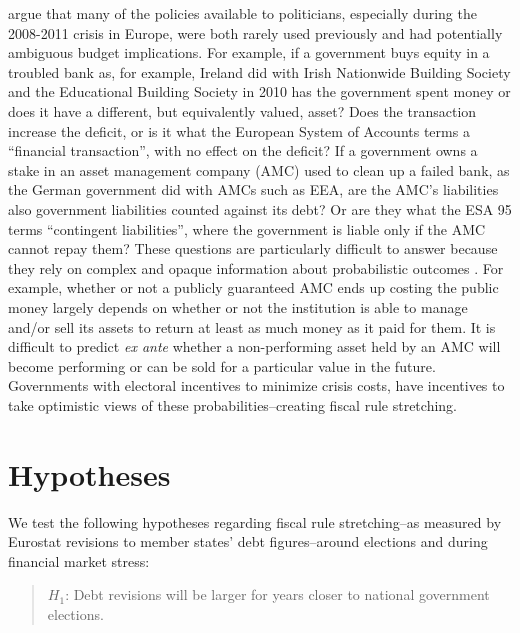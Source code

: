 \documentclass[]{article}
\begin{document}
\cite{GandrudHallerberg2016} argue that many of the policies available to politicians, especially during the 2008-2011 crisis in Europe, were both rarely used previously and had potentially ambiguous budget implications. For example, if a government buys equity in a troubled bank as, for example, Ireland did with Irish Nationwide Building Society and the Educational Building Society in 2010 has the government spent money or does it have a different, but equivalently valued, asset? Does the transaction increase the deficit, or is it what the European System of Accounts terms a ``financial transaction'', with no effect on the deficit? If a government owns a stake in an asset management company (AMC) used to clean up a failed bank, as the German government did with AMCs such as EEA, are the AMC's liabilities also government liabilities counted against its debt? Or are they what the ESA 95 terms ``contingent liabilities'', where the government is liable only if the AMC cannot repay them? These questions are particularly difficult to answer because they rely on complex and opaque information about probabilistic outcomes \citep{gandrudOkeeffe2016}. For example, whether or not a publicly guaranteed AMC ends up costing the public money largely depends on whether or not the institution is able to manage and/or sell its assets to return at least as much money as it paid for them. It is difficult to predict \emph{ex ante} whether a non-performing asset held by an AMC will become performing or can be sold for a particular value in the future. Governments with electoral incentives to minimize crisis costs, have incentives to take optimistic views of these probabilities--creating fiscal rule stretching.


\section{Hypotheses}

We test the following hypotheses regarding fiscal rule stretching--as measured by Eurostat revisions to member states' debt figures--around elections and during financial market stress:

\begin{quote}
    $H_{1}$: Debt revisions will be larger for years closer to national government elections.
\end{quote}
\end{document}

